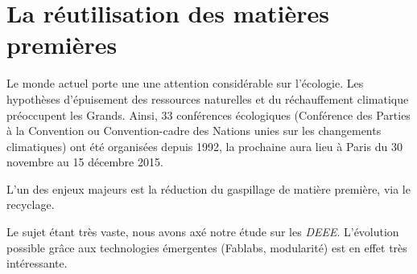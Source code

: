 \section{La réutilisation des matières premières}
Le monde actuel porte une une attention considérable sur l'écologie. Les hypothèses d'épui\-sement des ressources naturelles et du réchauffement climatique préoccupent les Grands. Ainsi, 33 conférences écologiques (Conférence des Parties à la Convention ou Convention-cadre des Nations unies sur les changements climatiques) ont été organisées depuis 1992, la prochaine aura lieu à Paris du  30 novembre au 15 décembre 2015. 

L'un des enjeux majeurs est la réduction du gaspillage de matière première, via le recyclage. 

Le sujet étant très vaste, nous avons axé notre étude sur les \textit{DEEE}. L'évolution possible grâce aux technologies  émergentes (Fablabs, modularité) est en effet très intéressante. 